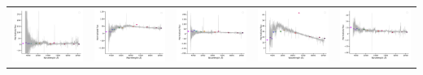 \begin{center}
\begin{longtable}{l l l l l }
    \includegraphics[width=0.19\linewidth, clip]{Figs/Figs-lamost/spec-56012-F5601204_sp13-173-SPLUS-n01s22-036940.pdf} & \includegraphics[width=0.19\linewidth, clip]{Figs/Figs-lamost/spec-56591-EG012606S021203F01_sp16-150-STRIPE82-0031-049213.pdf} & \includegraphics[width=0.19\linewidth, clip]{Figs/Figs-lamost/spec-56741-HD115451S012705B_sp12-016-SPLUS-n01s23-026372.pdf} & \includegraphics[width=0.19\linewidth, clip]{Figs/Figs-lamost/spec-56948-EG212551N003203M01_sp10-202-STRIPE82-0115-048674.pdf} & \includegraphics[width=0.19\linewidth, clip]{Figs/Figs-lamost/spec-57304-EG230517N011825M01_sp02-068-STRIPE82-0151-054324.pdf} \\

\end{longtable}
\end{center}
